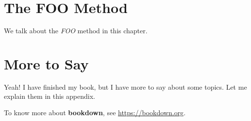 \documentclass[
]{krantz}
\begin{document}
\hypertarget{the-foo-method}{%
\chapter{The FOO Method}\label{the-foo-method}}

We talk about the \emph{FOO} method in this chapter.

\cleardoublepage

\hypertarget{appendix-appendix}{%
\appendix {}}


\hypertarget{more-to-say}{%
\chapter{More to Say}\label{more-to-say}}

Yeah! I have finished my book, but I have more to say about some topics. Let me explain them in this appendix.

To know more about \textbf{bookdown}, see \url{https://bookdown.org}.

  

\backmatter
\printindex
\end{document}
